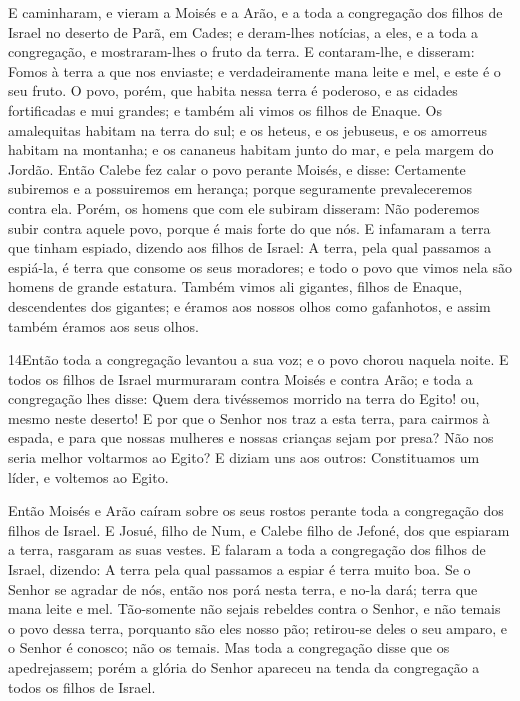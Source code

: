E caminharam, e vieram a Moisés e a Arão, e a toda a congregação
dos filhos de Israel no deserto de Parã, em Cades; e deram-lhes
notícias, a eles, e a toda a congregação, e mostraram-lhes o fruto
da terra. E contaram-lhe, e disseram: Fomos à terra a que nos
enviaste; e verdadeiramente mana leite e mel, e este é o seu fruto.
O povo, porém, que habita nessa terra é poderoso, e as
cidades fortificadas e mui grandes; e também ali vimos os filhos de
Enaque. Os amalequitas habitam na terra do sul; e os heteus,
e os jebuseus, e os amorreus habitam na montanha; e os cananeus
habitam junto do mar, e pela margem do Jordão. Então Calebe
fez calar o povo perante Moisés, e disse: Certamente subiremos e a
possuiremos em herança; porque seguramente prevaleceremos contra
ela. Porém, os homens que com ele subiram disseram: Não
poderemos subir contra aquele povo, porque é mais forte do que nós.
E infamaram a terra que tinham espiado, dizendo aos filhos de
Israel: A terra, pela qual passamos a espiá-la, é terra que consome
os seus moradores; e todo o povo que vimos nela são homens de grande
estatura. Também vimos ali gigantes, filhos de Enaque,
descendentes dos gigantes; e éramos aos nossos olhos como
gafanhotos, e assim também éramos aos seus olhos.

\medskip

\lettrine{14} Então toda a congregação levantou a sua voz; e o
povo chorou naquela noite. E todos os filhos de Israel
murmuraram contra Moisés e contra Arão; e toda a congregação lhes
disse: Quem dera tivéssemos morrido na terra do Egito! ou, mesmo
neste deserto! E por que o Senhor nos traz a esta terra, para
cairmos à espada, e para que nossas mulheres e nossas crianças sejam
por presa? Não nos seria melhor voltarmos ao Egito? E diziam uns
aos outros: Constituamos um líder, e voltemos ao Egito.

Então Moisés e Arão caíram sobre os seus rostos perante toda a
congregação dos filhos de Israel. E Josué, filho de Num, e
Calebe filho de Jefoné, dos que espiaram a terra, rasgaram as suas
vestes. E falaram a toda a congregação dos filhos de Israel,
dizendo: A terra pela qual passamos a espiar é terra muito boa.
Se o Senhor se agradar de nós, então nos porá nesta terra, e
no-la dará; terra que mana leite e mel. Tão-somente não sejais
rebeldes contra o Senhor, e não temais o povo dessa terra, porquanto
são eles nosso pão; retirou-se deles o seu amparo, e o Senhor é
conosco; não os temais. Mas toda a congregação disse que os
apedrejassem; porém a glória do Senhor apareceu na tenda da
congregação a todos os filhos de Israel.

